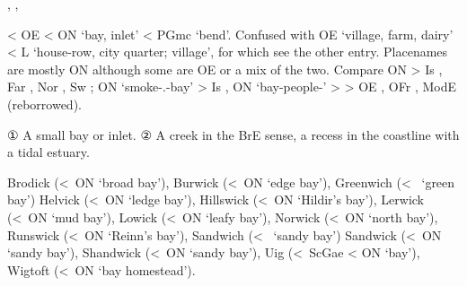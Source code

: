 \documentclass[12pt,letterpaper,oneside,article,draft]{memoir}
\begin{document}
\begin{Lemma}
\begin{Also}
	, , 
\end{Also}
\begin{Etymology}
	< OE  < ON  ‘bay, inlet’ < PGmc  ‘bend’.
	Confused with OE  ‘village, farm, dairy’ < L  ‘house-row, city quarter; village’, for
		which see the other  entry.
	Placenames are mostly ON although some are OE or a mix of the two.
	Compare
	ON  > Is , Far , Nor , Sw ;
	ON  ‘smoke-.-bay’ > Is ,
	ON  ‘bay-people-’ >  > OE , OFr ,
		ModE  (reborrowed).
\end{Etymology}
\begin{Definitions}
	① A small bay or inlet.
	② A creek in the BrE sense, a recess in the coastline with a tidal estuary.
\end{Definitions}
\begin{Examples}
	Brodick (<~ON  ‘broad bay’),
	Burwick (<~ON  ‘edge bay’),
	Greenwich (<~ ‘green bay’)
	Helvick (<~ON  ‘ledge bay’),
	Hillswick (<~ON  ‘Hildir’s bay’),
	Lerwick (<~ON  ‘mud bay’),
	Lowick (<~ON  ‘leafy bay’),
	Norwick (<~ON  ‘north bay’),
	Runswick (<~ON  ‘Reinn’s bay’),
	Sandwich (<~ ‘sandy bay’)
	Sandwick (<~ON  ‘sandy bay’),
	Shandwick (<~ON  ‘sandy bay’),
	Uig (<~ScGae  < ON  ‘bay’),
	Wigtoft (<~ON  ‘bay homestead’).
\end{Examples}
\end{Lemma}
\end{document}
